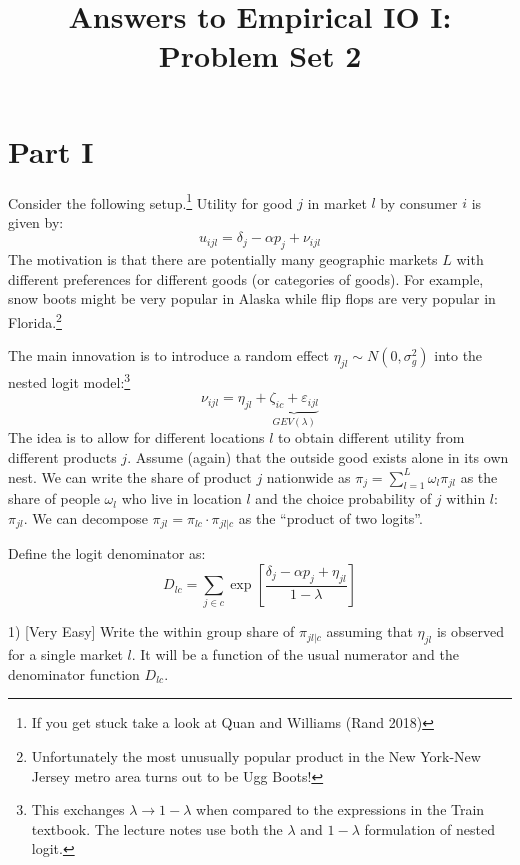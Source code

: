 \documentclass{article}
\begin{document}
\title{Answers to Empirical IO I: Problem Set 2}
\author{}
\date{}
\maketitle

\section*{Part I}

\begin{tcolorbox}
Consider the following setup.\footnote{If you get stuck take a look at Quan and Williams (Rand 2018)} Utility for good $j$ in market $l$ by consumer $i$ is given by:
\[
u_{ijl} = \delta_j - \alpha p_j + \nu_{ijl}
\]
The motivation is that there are potentially many geographic markets $L$ with different preferences for different goods (or categories of goods). For example, snow boots might be very popular in Alaska while flip flops are very popular in Florida.\footnote{Unfortunately the most unusually popular product in the New York-New Jersey metro area turns out to be Ugg Boots!}

The main innovation is to introduce a random effect $\eta_{jl} \sim N(0,\sigma_g^2)$ into the nested logit model:\footnote{This exchanges $\lambda \rightarrow 1-\lambda$ when compared to the expressions in the Train textbook. The lecture notes use both the $\lambda$ and $1-\lambda$ formulation of nested logit.}
\[
\nu_{ijl} = \eta_{jl}+ \underbrace{\zeta_{ic} + \varepsilon_{ijl}}_{GEV(\lambda)}
\]
The idea is to allow for different locations $l$ to obtain different utility from different products $j$. Assume (again) that the outside good exists alone in its own nest. We can write the share of product $j$ nationwide as $\pi_j = \sum_{l=1}^L \omega_l \pi_{jl}$ as the share of people $\omega_l$ who live in location $l$ and the choice probability of $j$ within $l$: $\pi_{jl}$. We can decompose $\pi_{jl} =  \pi_{lc} \cdot \pi_{jl|c}$ as the ``product of two logits''.

Define the logit denominator as:
\[
D_{lc} = \sum_{j \in c} \exp \left[\frac{\delta_j  -\alpha p_j+ \eta_{jl}}{1-\lambda}\right]
\]
\end{tcolorbox}

\begin{tcolorbox}
1) [Very Easy] Write the within group share of $\pi_{jl | c}$ assuming that $\eta_{jl}$ is observed for a single market $l$. It will be a function of the usual numerator and the denominator function $D_{lc}$.
\end{tcolorbox}
\end{document}
